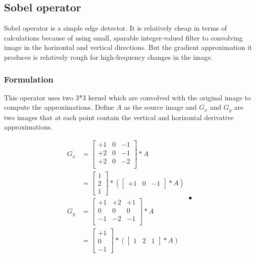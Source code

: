 \documentclass[10pt,twocolumn,letterpaper]{article}
\begin{document}
\subsection{Sobel operator}

Sobel operator is a simple edge detector. It is relatively cheap in terms 
of calculations because of using small, sparable integer-valued filter to 
convolving image in the horizontal and vertical directions. But the gradient 
approximation it produces is relatively rough for high-frequency changes in 
the image.

\subsubsection{Formulation}

This operator uses two 3*3 kernel which are convolved with the original 
image to compute the approximations\cite{ref4}. Define $A$ as the source image and 
$G_x$ and $G_y$ are two images that at each point contain the vertical and 
horizontal derivative approximations.

$$
\begin{aligned}
G_x & = 
	\begin{bmatrix}
		+1 & 0 & -1 \\
		+2 & 0 & -1 \\
		+2 & 0 & -2 \\
	\end{bmatrix} * A \\
    & = 
	\begin{bmatrix}
		1 \\ 2 \\ 1
	\end{bmatrix} * (
	\begin{bmatrix}
		+1 & 0 & -1
	\end{bmatrix}	* A) \\
G_y & = 
	\begin{bmatrix}
		+1 & +2 & +1 \\
		0 & 0 & 0 \\
		-1 & -2 & -1 \\
	\end{bmatrix} * A \\
    & = 
	\begin{bmatrix}
		+1 \\ 0 \\ -1
	\end{bmatrix} * (
	\begin{bmatrix}
		1 & 2 & 1
	\end{bmatrix}	* A) \\
\end{aligned}•
$$
\end{document}
